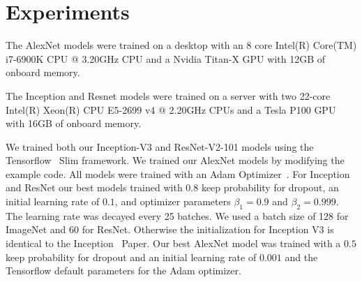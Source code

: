 \section{Experiments}
\label{s:experiments}

The AlexNet models were trained on a desktop with an 8 core Intel(R) Core(TM) i7-6900K CPU @ 3.20GHz CPU and a Nvidia Titan-X GPU with 12GB of onboard memory. 

The Inception and Resnet models were trained on a server with two 22-core Intel(R) Xeon(R) CPU E5-2699 v4 @ 2.20GHz CPUs and a Tesla P100 GPU with 16GB of onboard memory.

We trained both our Inception-V3 and ResNet-V2-101 models using the Tensorflow~\cite{tensorflow} Slim framework. We trained our AlexNet models by modifying the example code. All models were trained with an Adam Optimizer~\cite{adam}. For Inception and ResNet our best models trained with $0.8$ keep probability for dropout, an initial learning rate of $0.1$, and optimizer parameters $\beta_1 = 0.9$ and $\beta_2 =0.999$. The learning rate was decayed every 25 batches. We used a batch size of 128 for ImageNet and 60 for ResNet. Otherwise the initialization for Inception V3 is identical to the Inception~\cite{inception} Paper. Our best AlexNet model was trained with a  $0.5$ keep probability for dropout and an initial learning rate of $0.001$ and the Tensorflow default parameters for the Adam optimizer.

